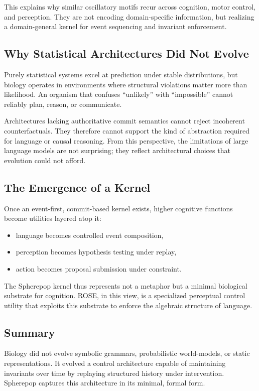 \documentclass[11pt]{article}
\begin{document}
This explains why similar oscillatory motifs recur across cognition, motor control, and perception. They are not encoding domain-specific information, but realizing a domain-general kernel for event sequencing and invariant enforcement.

\subsection{Why Statistical Architectures Did Not Evolve}

Purely statistical systems excel at prediction under stable distributions, but biology operates in environments where structural violations matter more than likelihood. An organism that confuses “unlikely” with “impossible” cannot reliably plan, reason, or communicate.

Architectures lacking authoritative commit semantics cannot reject incoherent counterfactuals. They therefore cannot support the kind of abstraction required for language or causal reasoning. From this perspective, the limitations of large language models are not surprising; they reflect architectural choices that evolution could not afford.

\subsection{The Emergence of a Kernel}

Once an event-first, commit-based kernel exists, higher cognitive functions become utilities layered atop it:

\begin{itemize}
  \item language becomes controlled event composition,
  \item perception becomes hypothesis testing under replay,
  \item action becomes proposal submission under constraint.
\end{itemize}

The Spherepop kernel thus represents not a metaphor but a minimal biological substrate for cognition. ROSE, in this view, is a specialized perceptual control utility that exploits this substrate to enforce the algebraic structure of language.

\subsection{Summary}

Biology did not evolve symbolic grammars, probabilistic world-models, or static representations. It evolved a control architecture capable of maintaining invariants over time by replaying structured history under intervention. Spherepop captures this architecture in its minimal, formal form.
\end{document}
